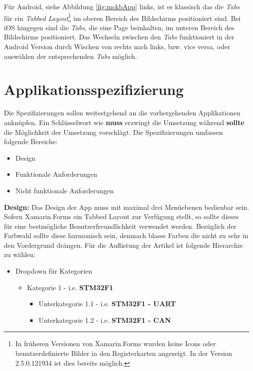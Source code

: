 	Für Android, siehe Abbildung \ref{fig:mckbApp} links, ist es klassisch das die \textit{Tabs} für ein \textit{Tabbed Layout}\footnote{In früheren Versionen von Xamarin.Forms wurden keine Icons oder benutzerdefinierte Bilder in den Registerkarten angezeigt. In der Version 2.5.0.121934 ist dies bereits möglich.} im oberen Bereich des Bildschirms positioniert sind. Bei iOS hingegen sind die \textit{Tabs}, die eine Page beinhalten, im unteren Bereich des Bildschirms positioniert. Das Wechseln zwischen den \textit{Tabs} funktioniert in der Android Version durch Wischen von rechts nach links, bzw. vice versa, oder auswählen der entsprechenden \textit{Tabs} möglich.
	\newpage

\section{Applikationsspezifizierung}
\label{sec:mckspecs}

	Die Spezifizierungen sollen weitestgehend an die vorhergehenden Applikationen anknüpfen. Ein Schlüsselwort wie \textbf{muss} erzwingt die Umsetzung während \textbf{sollte} die Möglichkeit der Umsetzung vorschlägt. Die Spezifizierungen umfassen folgende Bereiche:

	\begin{itemize}
		\setlength\itemsep{0em}
		\item Design
		\item Funktionale Anforderungen
		\item Nicht funktionale Anforderungen
	\end{itemize}

	\textbf{Design:} Das Design der App muss mit maximal drei Menüebenen bedienbar sein. Sofern Xamarin.Forms ein Tabbed Layout zur Verfügung stellt, so sollte dieses für eine bestmögliche Benutzerfreundlichkeit verwendet werden. Bezüglich der Farbwahl sollte diese harmonisch sein, demnach blasse Farben die nicht zu sehr in den Vordergrund drängen. Für die Auflistung der Artikel ist folgende Hierarchie zu wählen:

	\begin{itemize}
		\setlength\itemsep{0em}
		\item Dropdown für Kategorien
		\begin{itemize}
			\setlength\itemsep{0em}
			\item Kategorie 1 - i.e. \textbf{STM32F1}
			\begin{itemize}
				\setlength\itemsep{0em}
				\item Unterkategorie 1.1 - i.e. \textbf{STM32F1 - UART}
				\item Unterkategorie 1.2 - i.e. \textbf{STM32F1 - CAN}
			\end{itemize}
		\end{itemize}
	\end{itemize}

